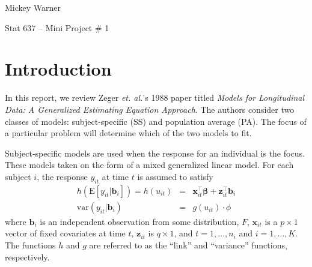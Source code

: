\documentclass[12pt]{article}
\newcommand{\m}[1]{\mathbf{\bm{#1}}}
\newcommand{\E}{\mathrm{E}}
\newcommand{\var}{\mathrm{var}}
\begin{document}
\noindent Mickey Warner
\bigskip

\noindent Stat 637 -- Mini Project \# 1

\section*{Introduction}

\noindent In this report, we review Zeger \emph{et. al.}'s 1988 paper titled \emph{Models for Longitudinal Data: A Generalized Estimating Equation Approach}. The authors consider two classes of models: subject-specific (SS) and population average (PA). The focus of a particular problem will determine which of the two models to fit.
\bigskip

\noindent Subject-specific models are used when the response for an individual is the focus. These models taken on the form of a mixed generalized linear model. For each subject $i$, the response $y_{it}$ at time $t$ is assumed to satisfy
\begin{eqnarray}
h(\E[y_{it}|\m{b}_i]) = h(u_{it}) &=& \m{x}_{it}^\top\m{\beta} + \m{z}_{it}^\top\m{b}_i \\
\var(y_{it}|\m{b}_i) &=& g(u_{it})\cdot \phi
\end{eqnarray}
where $\m{b}_i$ is an independent observation from some distribution, $F$, $\m{x}_{it}$ is a $p\times 1$ vector of fixed covariates at time $t$, $\m{z}_{it}$ is $q\times 1$, and $t=1,\ldots,n_i$ and $i=1,\ldots,K$. The functions $h$ and $g$ are referred to as the ``link'' and ``variance'' functions, respectively.
\end{document}
